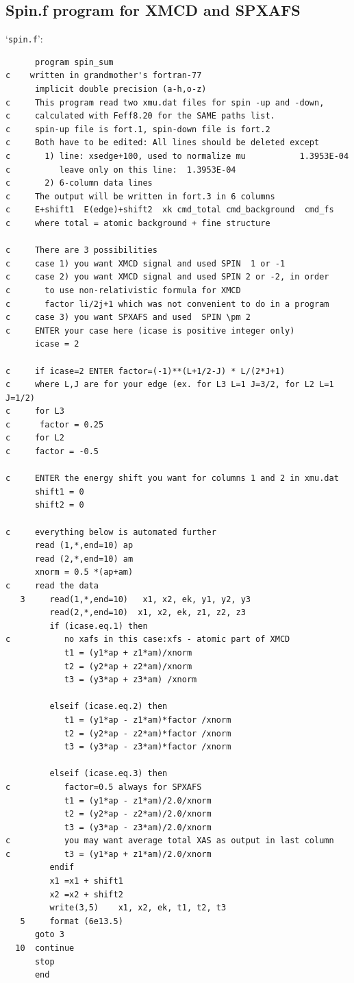 \documentclass[11pt,oneside]{report} %
\newcommand{\file}[1]{`\texttt{#1}'}
\begin{document}
\begin{latexonly}
\chapter{Spin.f program for XMCD and SPXAFS}
\label{sec:Append-F-Spinf}
\file{spin.f}:
\begin{verbatim}
      program spin_sum
c    written in grandmother's fortran-77   
      implicit double precision (a-h,o-z)
c     This program read two xmu.dat files for spin -up and -down,
c     calculated with Feff8.20 for the SAME paths list.
c     spin-up file is fort.1, spin-down file is fort.2
c     Both have to be edited: All lines should be deleted except
c       1) line: xsedge+100, used to normalize mu           1.3953E-04
c          leave only on this line:  1.3953E-04
c       2) 6-column data lines
c     The output will be written in fort.3 in 6 columns
c     E+shift1  E(edge)+shift2  xk cmd_total cmd_background  cmd_fs
c     where total = atomic background + fine structure

c     There are 3 possibilities
c     case 1) you want XMCD signal and used SPIN  1 or -1
c     case 2) you want XMCD signal and used SPIN 2 or -2, in order
c       to use non-relativistic formula for XMCD
c       factor li/2j+1 which was not convenient to do in a program
c     case 3) you want SPXAFS and used  SPIN \pm 2
c     ENTER your case here (icase is positive integer only)
      icase = 2

c     if icase=2 ENTER factor=(-1)**(L+1/2-J) * L/(2*J+1)
c     where L,J are for your edge (ex. for L3 L=1 J=3/2, for L2 L=1 J=1/2)
c     for L3
c      factor = 0.25
c     for L2
c     factor = -0.5

c     ENTER the energy shift you want for columns 1 and 2 in xmu.dat
      shift1 = 0
      shift2 = 0

c     everything below is automated further
      read (1,*,end=10) ap
      read (2,*,end=10) am
      xnorm = 0.5 *(ap+am)
c     read the data
   3     read(1,*,end=10)   x1, x2, ek, y1, y2, y3
         read(2,*,end=10)  x1, x2, ek, z1, z2, z3
         if (icase.eq.1) then
c           no xafs in this case:xfs - atomic part of XMCD
            t1 = (y1*ap + z1*am)/xnorm
            t2 = (y2*ap + z2*am)/xnorm
            t3 = (y3*ap + z3*am) /xnorm

         elseif (icase.eq.2) then
            t1 = (y1*ap - z1*am)*factor /xnorm
            t2 = (y2*ap - z2*am)*factor /xnorm
            t3 = (y3*ap - z3*am)*factor /xnorm

         elseif (icase.eq.3) then
c           factor=0.5 always for SPXAFS
            t1 = (y1*ap - z1*am)/2.0/xnorm
            t2 = (y2*ap - z2*am)/2.0/xnorm
            t3 = (y3*ap - z3*am)/2.0/xnorm
c           you may want average total XAS as output in last column
c           t3 = (y1*ap + z1*am)/2.0/xnorm
         endif
         x1 =x1 + shift1
         x2 =x2 + shift2
         write(3,5)    x1, x2, ek, t1, t2, t3
   5     format (6e13.5)
      goto 3
  10  continue
      stop
      end
\end{verbatim}



\end{latexonly}
\end{document}
